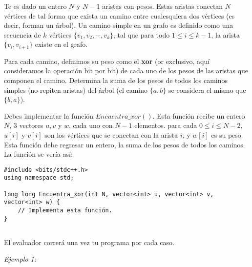 \documentclass[12pt]{scrartcl}
\begin{document}
    
    
    \vspace{10pt}

    
    
        Te es dado un entero $N$ y $N - 1$ aristas con pesos. Estas aristas conectan $N$ vértices de tal forma que exista un camino entre cualesquiera dos vértices (es decir, forman un árbol).
        Un camino simple en un grafo es definido como una secuencia de $k$ vértices $\{v_1, v_2, \cdots , v_k\}$, tal que para todo $1 \le i \le k - 1$, la arista $\{v_i, v_{i + 1}\}$ existe en el grafo. 
        
        Para cada camino, definimos su peso como el {\bfseries xor} (or exclusivo, aquí consideramos la operación bit por bit) de cada uno de los pesos de las aristas que componen el camino. Determina la suma de los pesos de todos los caminos simples (no repiten aristas) del árbol (el camino $\{a, b\}$ se considera el mismo que $\{b, a\}$).
        

        Debes implementar la función $Encuentra\_xor()$. Esta función recibe un entero $N$, 3 vectores $u, v$ y $w$, cada uno con $N - 1$ elementos. para cada $0 \le i \le N - 2$, $u[i]$ y $v[i]$ son los vértices que se conectan con la arista $i$, y $w[i]$ es su peso. Esta función debe regresar un entero, la suma de los pesos de todos los caminos.
        La función se vería así:

\begin{verbatim}
#include <bits/stdc++.h>
using namespace std;

long long Encuentra_xor(int N, vector<int> u, vector<int> v, vector<int> w) {
    // Implementa esta función.
}
    
\end{verbatim}

    El evaluador correrá una vez tu programa por cada caso.


               
        {\itshape Ejemplo 1:}
        
\end{document}
